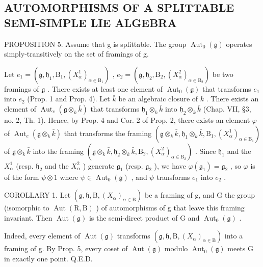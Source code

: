 \subsection{AUTOMORPHISMS OF A SPLITTABLE SEMI-SIMPLE LIE ALGEBRA}

PROPOSITION 5. Assume that g is splittable. The group \(\operatorname{Aut}_{0}(\mathfrak{g})\) operates simply-transitively on the set of framings of g.

Let \(e_1 = (\mathfrak{g}, \mathfrak{h}_1, \mathrm{B}_1, (X_\alpha^1)_{\alpha \in \mathrm{B}_1})\) , \(e_2 = (\mathfrak{g}, \mathfrak{h}_2, \mathrm{B}_2, (X_\alpha^2)_{\alpha \in \mathrm{B}_2})\) be two framings of \(\mathfrak{g}\) . There exists at least one element of \(\operatorname{Aut}_0(\mathfrak{g})\) that transforms \(e_1\) into \(e_2\) (Prop. 1 and Prop. 4). Let \(\bar{k}\) be an algebraic closure of \(k\) . There exists an element of \(\operatorname{Aut}_e(\mathfrak{g} \otimes_k \bar{k})\) that transforms \(\mathfrak{h}_1 \otimes_k \bar{k}\) into \(\mathfrak{h}_2 \otimes_k \bar{k}\) (Chap. VII, §3, no. 2, Th. 1). Hence, by Prop. 4 and Cor. 2 of Prop. 2, there exists an element \(\varphi\) of \(\operatorname{Aut}_e(\mathfrak{g} \otimes_k \bar{k})\) that transforms the framing \((\mathfrak{g} \otimes_k \bar{k}, \mathfrak{h}_1 \otimes_k \bar{k}, \mathrm{B}_1, (X_\alpha^1)_{\alpha \in \mathrm{B}_1})\) of \(\mathfrak{g} \otimes_k \bar{k}\) into the framing \((\mathfrak{g} \otimes_k \bar{k}, \mathfrak{h}_2 \otimes_k \bar{k}, \mathrm{B}_2, (X_\alpha^2)_{\alpha \in \mathrm{B}_2})\) . Since \(\mathfrak{h}_1\) and the \(X_\alpha^1\) (resp. \(\mathfrak{h}_2\) and the \(X_\alpha^2\) ) generate \(\mathfrak{g}_1\) (resp. \(\mathfrak{g}_2\) ), we have \(\varphi(\mathfrak{g}_1) = \mathfrak{g}_2\) , so \(\varphi\) is of the form \(\psi \otimes 1\) where \(\psi \in \operatorname{Aut}_0(\mathfrak{g})\) , and \(\psi\) transforms \(e_1\) into \(e_2\) .

COROLLARY 1. Let \((\mathfrak{g},\mathfrak{h},\mathrm{B},(X_{\alpha})_{\alpha\in\mathrm{B}})\) be a framing of g, and G the group (isomorphic to \(\operatorname{Aut}(\mathrm{R},\mathrm{B})\) ) of automorphisms of g that leave this framing invariant. Then \(\operatorname{Aut}(\mathfrak{g})\) is the semi-direct product of G and \(\operatorname{Aut}_{0}(\mathfrak{g})\) .

Indeed, every element of \(\operatorname{Aut}(\mathfrak{g})\) transforms \((\mathfrak{g},\mathfrak{h},\mathrm{B},(X_{\alpha})_{\alpha\in\mathrm{B}})\) into a framing of g. By Prop. 5, every coset of \(\operatorname{Aut}(\mathfrak{g})\) modulo \(\operatorname{Aut}_{0}(\mathfrak{g})\) meets G in exactly one point. Q.E.D.

